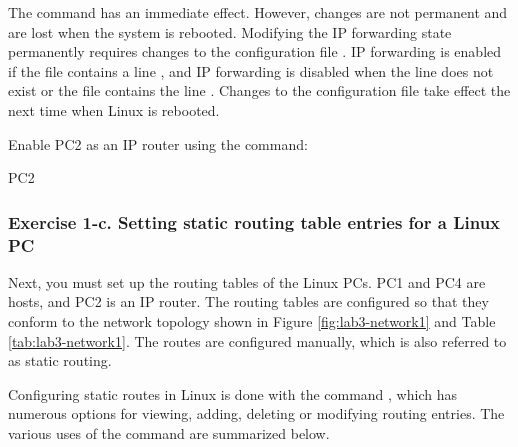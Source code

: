 The command has an immediate effect. However, changes are not permanent and are lost when the system is rebooted. Modifying the IP forwarding state permanently requires changes to the configuration file . IP forwarding is enabled if the file contains a line , and IP forwarding is disabled when the line does not exist or the file contains the line . Changes to the configuration file  take effect the next time when Linux is rebooted.

Enable PC2 as an IP router using the command:

\begin{cmdblock}
	PC2%
\end{cmdblock}

\subsubsection*{Exercise 1-c. Setting static routing table entries for a Linux PC}
Next, you must set up the routing tables of the Linux PCs. PC1 and PC4 are hosts, and PC2 is an IP router. The routing tables are configured so that they conform to the network topology shown in Figure \ref{fig:lab3-network1} and Table \ref{tab:lab3-network1}. The routes are configured manually, which is also referred to as static routing.

Configuring static routes in Linux is done with the command , which has numerous options for viewing, adding, deleting or modifying routing entries. The various uses of the  command are summarized below.

